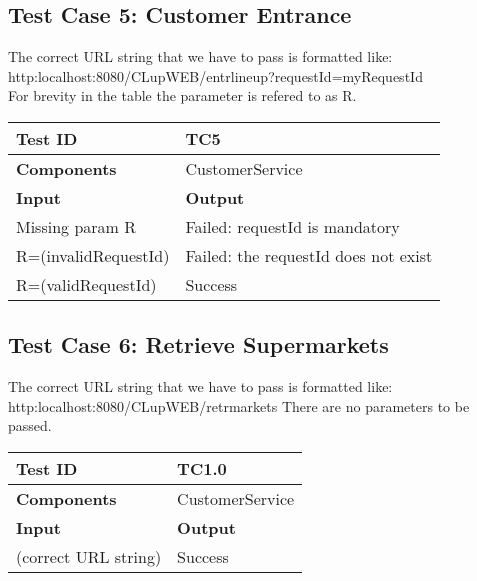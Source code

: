 \subsection{Test Case 5: Customer Entrance}
The correct URL string that we have to pass is formatted like: \\
{\footnotesize http:localhost:8080/CLupWEB/entrlineup?requestId=myRequestId} \\
For brevity in the table the parameter is refered to as R.
\begin{center}
    \begin{tabular}{ |  p{8cm} | p{8cm} |}
    \hline
     \textbf{Test ID}  & TC5 \\ \hline
     \textbf{Components}  & CustomerService\\ \hline
    \textbf{Input} & \textbf{Output}  \\ \hline
   Missing param R & Failed: requestId is mandatory   \\ \hline
    R=(invalidRequestId) & Failed: the requestId does not exist \\ \hline	
    R=(validRequestId) & Success \\ \hline
    \end{tabular}
\end{center}
\subsection{Test Case 6: Retrieve Supermarkets}
The correct URL string that we have to pass is formatted like: \\
{\footnotesize http:localhost:8080/CLupWEB/retrmarkets}
There are no parameters to be passed.
\begin{center}
    \begin{tabular}{ |  p{8cm} | p{8cm} |}
    \hline
     \textbf{Test ID}  & TC1.0 \\ \hline
     \textbf{Components}  & CustomerService\\ \hline
    \textbf{Input} & \textbf{Output}  \\ \hline
    (correct URL string) & Success \\ \hline
    \end{tabular}
\end{center}







